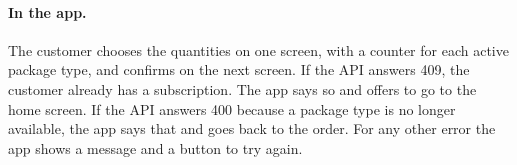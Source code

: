 \documentclass[a4paper,11pt]{article}
\begin{document}
\paragraph{In the app.} The customer chooses the quantities on one screen, with a counter for each active package type, and confirms on the next screen. If the API answers 409, the customer already has a subscription. The app says so and offers to go to the home screen. If the API answers 400 because a package type is no longer available, the app says that and goes back to the order. For any other error the app shows a message and a button to try again.

\printbibliography
\end{document}
